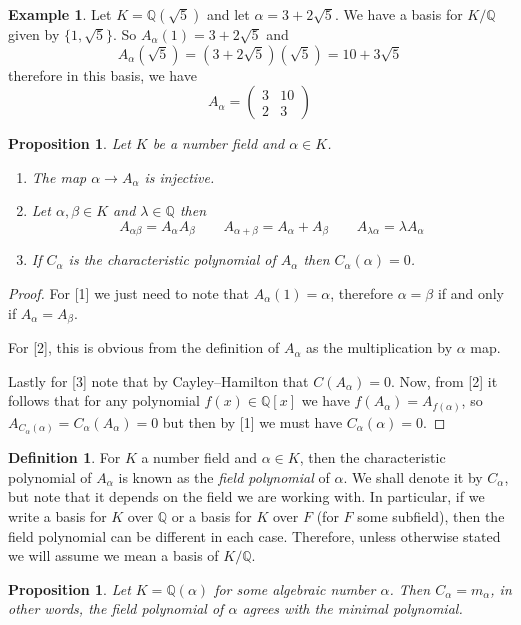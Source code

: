 \documentclass[11pt,a4paper]{report}
\theoremstyle{plain}
\newtheorem{prop}[subsection]{Proposition}
\theoremstyle{definition}
\newtheorem{definition}[subsection]{Definition}
\newtheorem{exmp}[subsection]{Example}
\theoremstyle{definition}
\def\QQ{\mathbb{Q}}
\def \a{\alpha}
\def \lam {\lambda}
\newcommand{\matrd}[4]{\begin{pmatrix}#1&#2\\#3&#4\end{pmatrix}}
\begin{document}
	\begin{exmp}
		Let $K=\QQ(\sqrt{5})$ and let $\a=3+2\sqrt{5}$.  We have a basis for $K/\QQ$ given by $\{1,\sqrt{5}\}.$ So $A_\a(1)=3+2\sqrt{5}$ and \[A_\a(\sqrt{5})=(3+2\sqrt{5})(\sqrt{5})=10+3\sqrt{5}\] therefore in this basis, we have \[A_\a=\matrd{3}{10}{2}{3}\]
	\end{exmp}
	
	\begin{prop}Let $K$ be a number field and $\a \in K$.
		\begin{enumerate}
			\item[1] The map $\a \to A_\a$ is injective.
			\item[2] Let $\a,\beta \in K$ and $\lam \in \QQ$ then \[A_{\a \beta}=A_{\a}A_{\beta} \qquad A_{\a+\beta}=A_\a+ A_\beta \qquad A_{\lam \a}=\lam A_\a\]
			\item[3] If $C_\a$ is the characteristic polynomial of $A_\a$ then $C_\a(\a)=0$.
		\end{enumerate}
	\end{prop}
	
	\begin{proof}
		For [1] we just need to note that $A_\a(1)=\a$, therefore $\a=\beta$ if and only if $A_\a=A_\beta$.
		
		For [2], this is obvious from the definition of $A_\a$ as the multiplication by $\a$ map.
		
		Lastly for [3] note that by Cayley--Hamilton that $C(A_\a)=0$. Now, from [2] it follows that for any polynomial $f(x) \in \QQ[x]$ we have $f(A_\a)=A_{f(\a)}$, so $A_{C_\a(\a)}=C_\a(A_\a)=0$ but then by [1] we must have $C_\a(\a)=0$. 
		
	\end{proof}
	
	\begin{definition}
		For $K$ a number field and $\a \in K$, then the characteristic polynomial of $A_\a$ is known as the \textit{field polynomial} of $\a$. We shall denote it by $C_\a$, but note that it depends on the field we are working with. In particular, if we write a basis for $K$ over $\QQ$ or a basis for $K$ over $F$ (for $F$ some subfield), then the field polynomial can be different in each case. Therefore, unless otherwise stated we will assume we mean a basis of $K/\QQ$.
	\end{definition}
	
	\begin{prop}\label{prop: field pol min pol}
		Let $K=\QQ(\a)$ for some algebraic number $\a$. Then $C_\a=m_\a$, in other words, the field polynomial of $\a$ agrees with the minimal polynomial.
	\end{prop}
	
\end{document}
